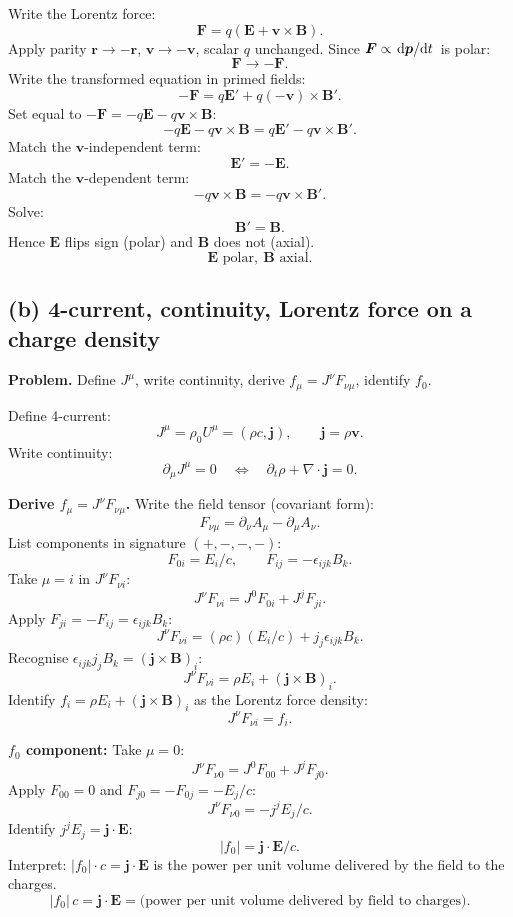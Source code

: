 \documentclass[11pt]{article}
\begin{document}
Write the Lorentz force:
\[ \bm F = q(\bm E + \bm v\times\bm B). \]
Apply parity $\bm r\to -\bm r$, $\bm v\to -\bm v$, scalar $q$ unchanged. Since $\bm F\propto\dv*{\bm p}{t}$ is polar:
\[ \bm F \to -\bm F. \]
Write the transformed equation in primed fields:
\[ -\bm F = q\bm E' + q(-\bm v)\times\bm B'. \]
Set equal to $-\bm F = -q\bm E - q\bm v\times\bm B$:
\[ -q\bm E - q\bm v\times\bm B = q\bm E' - q\bm v\times\bm B'. \]
Match the $\bm v$-independent term:
\[ \bm E' = -\bm E. \]
Match the $\bm v$-dependent term:
\[ -q\bm v\times\bm B = -q\bm v\times\bm B'. \]
Solve:
\[ \bm B' = \bm B. \]
Hence $\bm E$ flips sign (polar) and $\bm B$ does not (axial).
\[ \boxed{\;\bm E\text{ polar},\ \bm B\text{ axial}.\;} \]

\subsection*{(b) 4-current, continuity, Lorentz force on a charge density}

\textbf{Problem.} Define $J^\mu$, write continuity, derive $f_\mu = J^\nu F_{\nu\mu}$, identify $f_0$.

Define 4-current:
\[ J^\mu = \rho_0 U^\mu = (\rho c, \bm j),\qquad \bm j = \rho\bm v. \]
Write continuity:
\[ \boxed{\;\partial_\mu J^\mu = 0 \quad\Leftrightarrow\quad \partial_t\rho + \nabla\!\cdot\!\bm j = 0.\;} \]

\noindent\textbf{Derive $f_\mu = J^\nu F_{\nu\mu}$.} Write the field tensor (covariant form):
\[ F_{\nu\mu} = \partial_\nu A_\mu - \partial_\mu A_\nu. \]
List components in signature $(+,-,-,-)$:
\[ F_{0i} = E_i/c,\qquad F_{ij} = -\epsilon_{ijk}B_k. \]
Take $\mu = i$ in $J^\nu F_{\nu i}$:
\[ J^\nu F_{\nu i} = J^0 F_{0 i} + J^j F_{j i}. \]
Apply $F_{ji} = -F_{ij} = \epsilon_{ijk}B_k$:
\[ J^\nu F_{\nu i} = (\rho c)(E_i/c) + j_j\epsilon_{ijk}B_k. \]
Recognise $\epsilon_{ijk}j_j B_k = (\bm j\times\bm B)_i$:
\[ J^\nu F_{\nu i} = \rho E_i + (\bm j\times\bm B)_i. \]
Identify $f_i = \rho E_i + (\bm j\times\bm B)_i$ as the Lorentz force density:
\[ J^\nu F_{\nu i} = f_i. \]

\noindent\textbf{$f_0$ component:}
Take $\mu = 0$:
\[ J^\nu F_{\nu 0} = J^0 F_{00} + J^j F_{j0}. \]
Apply $F_{00}=0$ and $F_{j0} = -F_{0j} = -E_j/c$:
\[ J^\nu F_{\nu 0} = -j^j E_j/c. \]
Identify $j^j E_j = \bm j\cdot\bm E$:
\[ |f_0| = \bm j\!\cdot\!\bm E/c. \]
Interpret: $|f_0|\cdot c = \bm j\cdot\bm E$ is the power per unit volume delivered by the field to the charges.
\[ \boxed{\;|f_0|\,c = \bm j\!\cdot\!\bm E = \text{(power per unit volume delivered by field to charges)}.\;} \]
\end{document}
